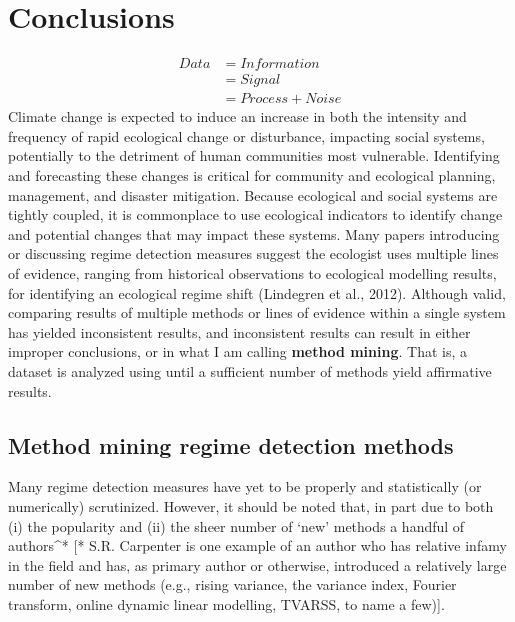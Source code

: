 \documentclass[12pt,twoside,openany]{reedthesis}
\begin{document}
\chapter{Conclusions}\label{conclusions}
\begin{equation}
\begin{split}
Data  & = Information \\
& = Signal \\
& = Process + Noise
\end{split}
\label{eq:infoTheory}
\end{equation}
Climate change is expected to induce an increase in both the intensity
and frequency of rapid ecological change or disturbance, impacting
social systems, potentially to the detriment of human communities most
vulnerable. Identifying and forecasting these changes is critical for
community and ecological planning, management, and disaster mitigation.
Because ecological and social systems are tightly coupled, it is
commonplace to use ecological indicators to identify change and
potential changes that may impact these systems. Many papers introducing
or discussing regime detection measures suggest the ecologist uses
multiple lines of evidence, ranging from historical observations to
ecological modelling results, for identifying an ecological regime shift
(Lindegren et al., 2012). Although valid, comparing results of multiple
methods or lines of evidence within a single system has yielded
inconsistent results, and inconsistent results can result in either
improper conclusions, or in what I am calling \textbf{method mining}.
That is, a dataset is analyzed using until a sufficient number of
methods yield affirmative results.

\section{Method mining regime detection
methods}\label{method-mining-regime-detection-methods}

Many regime detection measures have yet to be properly and statistically
(or numerically) scrutinized. However, it should be noted that, in part
due to both (i) the popularity and (ii) the sheer number of `new'
methods a handful of authors\^{}* {[}* S.R. Carpenter is one example of
an author who has relative infamy in the field and has, as primary
author or otherwise, introduced a relatively large number of new methods
(e.g., rising variance, the variance index, Fourier transform, online
dynamic linear modelling, TVARSS, to name a few){]}.
\end{document}
